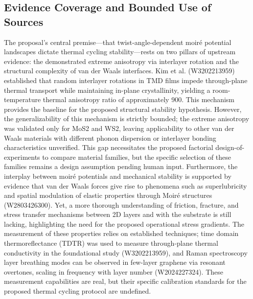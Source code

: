 \documentclass[conference]{IEEEtran}
\begin{document}
\subsection{Evidence Coverage and Bounded Use of Sources}
The proposal's central premise—that twist-angle-dependent moiré potential landscapes dictate thermal cycling stability—rests on two pillars of upstream evidence: the demonstrated extreme anisotropy via interlayer rotation and the structural complexity of van der Waals interfaces. Kim et al. (W3202213959) established that random interlayer rotations in TMD films impede through-plane thermal transport while maintaining in-plane crystallinity, yielding a room-temperature thermal anisotropy ratio of approximately 900. This mechanism provides the baseline for the proposed structural stability hypothesis. However, the generalizability of this mechanism is strictly bounded; the extreme anisotropy was validated only for MoS2 and WS2, leaving applicability to other van der Waals materials with different phonon dispersion or interlayer bonding characteristics unverified. This gap necessitates the proposed factorial design-of-experiments to compare material families, but the specific selection of these families remains a design assumption pending human input. Furthermore, the interplay between moiré potentials and mechanical stability is supported by evidence that van der Waals forces give rise to phenomena such as superlubricity and spatial modulation of elastic properties through Moiré structures (W2803426300). Yet, a more thorough understanding of friction, fracture, and stress transfer mechanisms between 2D layers and with the substrate is still lacking, highlighting the need for the proposed operational stress gradients. The measurement of these properties relies on established techniques; time domain thermoreflectance (TDTR) was used to measure through-plane thermal conductivity in the foundational study (W3202213959), and Raman spectroscopy layer breathing modes can be observed in few-layer graphene via resonant overtones, scaling in frequency with layer number (W2024227324). These measurement capabilities are real, but their specific calibration standards for the proposed thermal cycling protocol are undefined.~\cite{cite_26ecaf73d88dfe33,cite_6b49ace365c37cc5}
\end{document}
